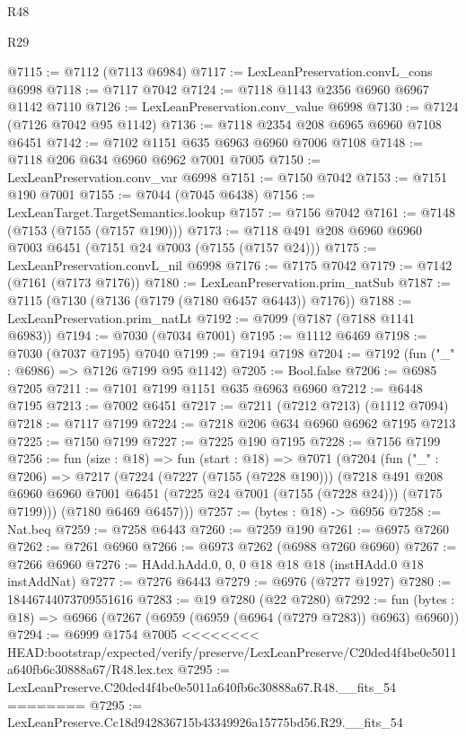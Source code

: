 \begin{lexlean}{R48}
\begin{lexlean}{R29}
\begin{coremodule}
{{{{{{{{{{{{{{{{{{{{{{{{{{{{{{{{{{{{{{{{{{{{{{{{{{{{{{{{{{{{{{{{{{{{{{{{{{{{{{{{{{{{{{{{{{{{{{{{{{{{{{{{{{{{{{{{{{{{{{{{{{{{{{{{{{{{{{{{{{{{{{{{{{{{{{{{{{{{{{{{{{{{{{{{{{{{{{{{{{{{{{{{{{{{{{{{{{{{{{{{{{{{{{{{{{{{{{{{{{@7115 := @7112 (@7113 @6984)
@7117 := LexLeanPreservation.convL_cons @6998
@7118 := @7117 @7042
@7124 := @7118 @1143 @2356 @6960 @6967 @1142 @7110
@7126 := LexLeanPreservation.conv_value @6998
@7130 := @7124 (@7126 @7042 @95 @1142)
@7136 := @7118 @2354 @208 @6965 @6960 @7108 @6451
@7142 := @7102 @1151 @635 @6963 @6960 @7006 @7108
@7148 := @7118 @206 @634 @6960 @6962 @7001 @7005
@7150 := LexLeanPreservation.conv_var @6998
@7151 := @7150 @7042
@7153 := @7151 @190 @7001
@7155 := @7044 (@7045 @6438)
@7156 := LexLeanTarget.TargetSemantics.lookup
@7157 := @7156 @7042
@7161 := @7148 (@7153 (@7155 (@7157 @190)))
@7173 := @7118 @491 @208 @6960 @6960 @7003 @6451 (@7151 @24 @7003 (@7155 (@7157 @24)))
@7175 := LexLeanPreservation.convL_nil @6998
@7176 := @7175 @7042
@7179 := @7142 (@7161 (@7173 @7176))
@7180 := LexLeanPreservation.prim_natSub
@7187 := @7115 (@7130 (@7136 (@7179 (@7180 @6457 @6443)) @7176))
@7188 := LexLeanPreservation.prim_natLt
@7192 := @7099 (@7187 (@7188 @1141 @6983))
@7194 := @7030 (@7034 @7001)
@7195 := @1112 @6469
@7198 := @7030 (@7037 @7195) @7040
@7199 := @7194 @7198
@7204 := @7192 (fun ("_" : @6986) => @7126 @7199 @95 @1142)
@7205 := Bool.false
@7206 := @6985 @7205
@7211 := @7101 @7199 @1151 @635 @6963 @6960
@7212 := @6448 @7195
@7213 := @7002 @6451
@7217 := @7211 (@7212 @7213) (@1112 @7094)
@7218 := @7117 @7199
@7224 := @7218 @206 @634 @6960 @6962 @7195 @7213
@7225 := @7150 @7199
@7227 := @7225 @190 @7195
@7228 := @7156 @7199
@7256 := fun (size : @18) =>
  fun (start : @18) =>
  @7071
    (@7204
      (fun ("_" : @7206) =>
      @7217
        (@7224
          (@7227 (@7155 (@7228 @190)))
          (@7218
            @491
            @208
            @6960
            @6960
            @7001
            @6451
            (@7225 @24 @7001 (@7155 (@7228 @24)))
            (@7175 @7199)))
        (@7180 @6469 @6457)))
@7257 := (bytes : @18) -> @6956
@7258 := Nat.beq
@7259 := @7258 @6443
@7260 := @7259 @190
@7261 := @6975 @7260
@7262 := @7261 @6960
@7266 := @6973 @7262 (@6988 @7260 @6960)
@7267 := @7266 @6960
@7276 := HAdd.hAdd.{0, 0, 0} @18 @18 @18 (instHAdd.{0} @18 instAddNat)
@7277 := @7276 @6443
@7279 := @6976 (@7277 @1927)
@7280 := 18446744073709551616
@7283 := @19 @7280 (@22 @7280)
@7292 := fun (bytes : @18) => @6966 (@7267 (@6959 (@6959 (@6964 (@7279 @7283)) @6963) @6960))
@7294 := @6999 @1754 @7005
<<<<<<<< HEAD:bootstrap/expected/verify/preserve/LexLeanPreserve/C20ded4f4be0e5011a640fb6c30888a67/R48.lex.tex
@7295 := LexLeanPreserve.C20ded4f4be0e5011a640fb6c30888a67.R48.__fits_54
========
@7295 := LexLeanPreserve.Cc18d942836715b43349926a15775bd56.R29.__fits_54
}}}}}}}}}}}}}}}}}}}}}}}}}}}}}}}}}}}}}}}}}}}}}}}}}}}}}}}}}}}}}}}}}}}}}}}}}}}}}}}}}}}}}}}}}}}}}}}}}}}}}}}}}}}}}}}}}}}}}}}}}}}}}}}}}}}}}}}}}}}}}}}}}}}}}}}}}}}}}}}}}}}}}}}}}}}}}}}}}}}}}}}}}}}}}}}}}}}}}}}}}}}}}}}}}}}}}}}}}}
\end{coremodule}
\end{lexlean}
\end{lexlean}
